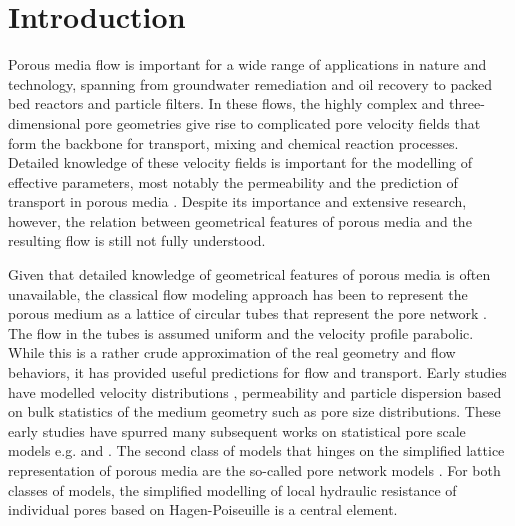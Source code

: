 \documentclass[draft]{agujournal2019}
\begin{document}
%
%

\section{Introduction}

Porous media flow is important for a wide range of applications in nature and technology, spanning from groundwater remediation and oil recovery to packed bed reactors and particle filters. In these flows, the highly complex and three-dimensional pore geometries give rise to complicated pore velocity fields that form the backbone for transport, mixing and chemical reaction processes. Detailed knowledge of these velocity fields is important for the modelling of effective parameters, most notably the permeability and the prediction of transport in porous media \cite{bear_dynamics_1972,scheidegger_physics_1974}. Despite its importance and extensive research, however, the relation between geometrical features of porous media and the resulting flow is still not fully understood.


Given that detailed knowledge of geometrical features of porous media is often unavailable, the classical flow modeling approach has been to represent the porous medium as a lattice of circular tubes that represent the pore network \cite{scheidegger_physics_1974}. The flow in the tubes is assumed uniform and the velocity profile parabolic. While this is a rather crude approximation of the real geometry and flow behaviors, it has provided useful predictions for flow and transport. Early studies have modelled velocity distributions \cite{haring_statistical_1970}, permeability \cite{fatt_network_1956,katz_quantitative_1986} and particle dispersion \cite{saffman_theory_1959} based on bulk statistics of the medium geometry such as pore size distributions. These early studies have spurred many subsequent works on statistical pore scale models e.g.  and . The second class of models that hinges on the simplified lattice representation of porous media are the so-called pore network models \cite{thompson_modeling_1997}. For both classes of models, the simplified modelling of local hydraulic resistance of individual pores based on Hagen-Poiseuille is a central element.
\end{document}

